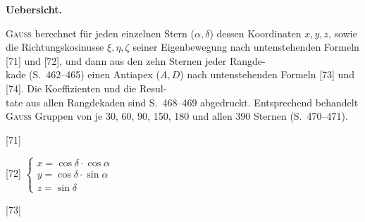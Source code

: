 \documentclass[12pt,a4paper]{article}
\theoremstyle{plain}
\theoremstyle{definition}
\theoremstyle{remark}
\begin{document}
\newpage
\begin{small}
\begin{center}
\textbf{Uebersicht.}

\textsc{Gau\ss} berechnet f\"ur jeden einzelnen Stern ($\alpha, \delta$) dessen
Koordinaten $x, y, z$, sowie die Richtungskosinusse $\xi, \eta, \zeta$ seiner
Eigenbewegung nach untenstehenden Formeln [71] und [72], und dann aus den
zehn Sternen jeder Rangde-\\
kade (S.~462--465) einen Antiapex ($A, D$) nach untenstehenden
Formeln [73] und [74]. Die Koeffizienten und die Resul-\\
tate aus allen Rangdekaden sind S.~468--469 abgedruckt.
Entsprechend behandelt \textsc{Gau\ss} Gruppen von je 30, 60, 90,
150, 180 und allen 390 Sternen (S.~470--471).
\end{center}

\begin{center}
\hspace{0.5cm}
[71]
\end{center}

\begin{center}
[72] $\left\{\begin{array}{l}
x = \cos\delta\cdot\cos\alpha\\
y = \cos\delta\cdot\sin\alpha\\
z = \sin\delta
\end{array}\right.$
\end{center}

\begin{center}
\hspace{0.5cm}
[73]
\end{center}


\end{small}
\end{document}

